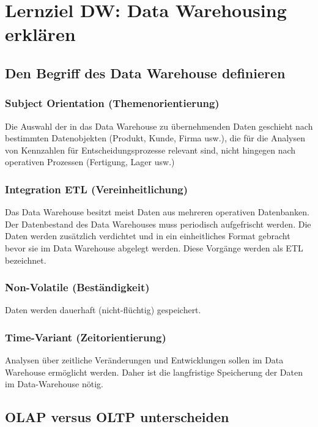 \section{Lernziel DW: Data Warehousing erklären}

\subsection{Den Begriff des Data Warehouse definieren}

\subsubsection{Subject Orientation (Themenorientierung)}

Die Auswahl der in das Data Warehouse zu übernehmenden Daten geschieht nach bestimmten Datenobjekten (Produkt, Kunde, Firma usw.), die für die Analysen von Kennzahlen für Entscheidungsprozesse relevant sind, nicht hingegen nach operativen Prozessen (Fertigung, Lager usw.)

\subsubsection{Integration ETL (Vereinheitlichung)}

Das Data Warehouse besitzt meist Daten aus mehreren operativen Datenbanken. Der Datenbestand des Data Warehouses muss periodisch aufgefrischt werden. Die Daten werden zusätzlich verdichtet und in ein einheitliches Format gebracht bevor sie im Data Warehouse abgelegt werden. Diese Vorgänge werden als \ac{ETL} bezeichnet.

\subsubsection{Non-Volatile (Beständigkeit)}

Daten werden dauerhaft (nicht-flüchtig) gespeichert.

\subsubsection{Time-Variant (Zeitorientierung)}

Analysen über zeitliche Veränderungen und Entwicklungen sollen im Data Warehouse ermöglicht werden. Daher ist die langfristige Speicherung der Daten im Data-Warehouse nötig.

\subsection{OLAP versus OLTP unterscheiden}

